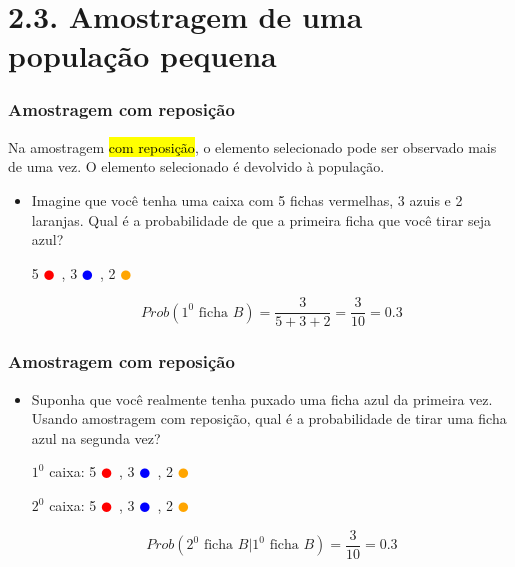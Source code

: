 
\section{2.3. Amostragem de uma população pequena}


\begin{frame}
\frametitle{Amostragem com reposição}
\justifying
Na amostragem \hl{com reposição}, o elemento selecionado pode ser observado mais de uma vez. O elemento selecionado é devolvido à população. 

\pause

\begin{itemize}
\justifying
\item Imagine que você tenha uma caixa com 5 fichas vermelhas, 3 azuis e 2 laranjas. Qual é a probabilidade de que a primeira ficha que você tirar seja azul?

\begin{center}
5 \textcolor{red}{$\CIRCLE$}~, 3 \textcolor{blue}{$\CIRCLE$}~, 2 \textcolor{orange}{$\CIRCLE$}
\end{center}

\pause

\[ Prob(1^{0} \text{ ficha } B) = \frac{3}{5 + 3 + 2} = \frac{3}{10} = 0.3 \]

\pause
\end{itemize}

\end{frame}


\begin{frame}
\frametitle{Amostragem com reposição}

\begin{itemize}
\justifying
\item Suponha que você realmente tenha puxado uma ficha azul da primeira vez. Usando amostragem com reposição, qual é a probabilidade de tirar uma ficha azul na segunda vez?

\pause

\begin{center}
$1^{0}$ caixa: 5 \textcolor{red}{$\CIRCLE$}~, 3 \textcolor{blue}{$\CIRCLE$}~, 2 \textcolor{orange}{$\CIRCLE$} \\

\pause

$2^{0}$ caixa: 5 \textcolor{red}{$\CIRCLE$}~, 3 \textcolor{blue}{$\CIRCLE$}~, 2 \textcolor{orange}{$\CIRCLE$}
\end{center}

\pause

\[ Prob(2^{0} \text{ ficha } B | 1^{0} \text{ ficha } B) = \frac{3}{10} = 0.3 \]

\end{itemize}

\end{frame}

